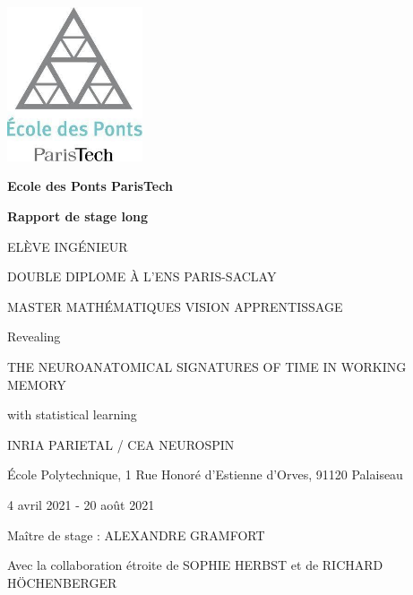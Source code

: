 \begin{titlepage}
    \begin{center}
        
        
        \includegraphics[width=4cm]{preliminaries/images/logo_ponts.jpg}
        
        \vspace{0.5cm}
        
        \textbf{Ecole des Ponts ParisTech}

        \vspace{1.5cm}
        
        \textbf{\Large Rapport de stage long}
        
        \vspace{0.5cm}
        
        \MakeUppercase{\theauthor{}}
        
        \MakeUppercase{Elève ingénieur}
        
        \MakeUppercase{Double diplome à l'ENS Paris-Saclay}

        \MakeUppercase{Master Mathématiques Vision Apprentissage}
        
        \vspace{1.5cm}
        
        Revealing
        
        \MakeUppercase{\Large the neuroanatomical signatures of time in working memory}
        
        with statistical learning
        
        
    
        
        
        
        \vfill
        
        \MakeUppercase{INRIA Parietal / CEA Neurospin}
        
        École Polytechnique, 1 Rue Honoré d'Estienne d'Orves, 91120 Palaiseau
        
        4 avril 2021 - 20 août 2021
        
        Maître de stage : \MakeUppercase{Alexandre Gramfort}
        
        Avec la collaboration étroite de \MakeUppercase{Sophie Herbst} et de \MakeUppercase{Richard Höchenberger}
        
    \end{center}
\end{titlepage}
